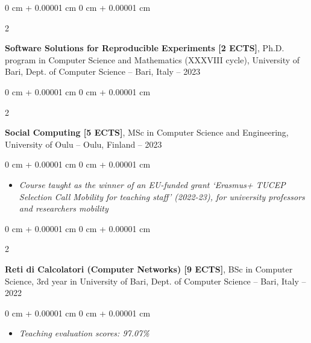 \documentclass[10pt, a4paper]{article}
\newenvironment{highlights}{
    \begin{itemize}[
        topsep=0.10 cm,
        parsep=0.10 cm,
        partopsep=0pt,
        itemsep=0pt,
        leftmargin=0 cm + 10pt
    ]
}{
    \end{itemize}
} %
\newenvironment{onecolentry}{
    \begin{adjustwidth}{
        0 cm + 0.00001 cm
    }{
        0 cm + 0.00001 cm
    }
}{
    \end{adjustwidth}
} %
\newenvironment{twocolentry}[2][]{
    \onecolentry
    \def\secondColumn{#2}
    \setcolumnwidth{\fill, 4.5 cm}
    \begin{paracol}{2}
}{
    \switchcolumn \raggedleft \secondColumn
    \end{paracol}
    \endonecolentry
} %
\begin{document}
        \vspace{0.2 cm}

        \begin{twocolentry}{
            2022 – 2023
        }
            \textbf{Software Solutions for Reproducible Experiments [2 ECTS]}, Ph.D. program in Computer Science and Mathematics (XXXVIII cycle), University of Bari, Dept. of Computer Science -- Bari, Italy\end{twocolentry}



        \vspace{0.2 cm}

        \begin{twocolentry}{
            2022 – 2023
        }
            \textbf{Social Computing [5 ECTS]}, MSc in Computer Science and Engineering, University of Oulu -- Oulu, Finland\end{twocolentry}

        \vspace{0.10 cm}
        \begin{onecolentry}
            \begin{highlights}
                \item \textit{Course taught as the winner of an EU-funded grant `Erasmus+ TUCEP Selection Call Mobility for teaching staff' (2022-23), for university professors and researchers mobility}
            \end{highlights}
        \end{onecolentry}


        \vspace{0.2 cm}

        \begin{twocolentry}{
            2021 – 2022
        }
            \textbf{Reti di Calcolatori (Computer Networks) [9 ECTS]}, BSc in Computer Science, 3rd year in University of Bari, Dept. of Computer Science -- Bari, Italy\end{twocolentry}

        \vspace{0.10 cm}
        \begin{onecolentry}
            \begin{highlights}
                \item \textit{Teaching evaluation scores: 97.07\%}
            \end{highlights}
        \end{onecolentry}


        \vspace{0.2 cm}
\end{document}
